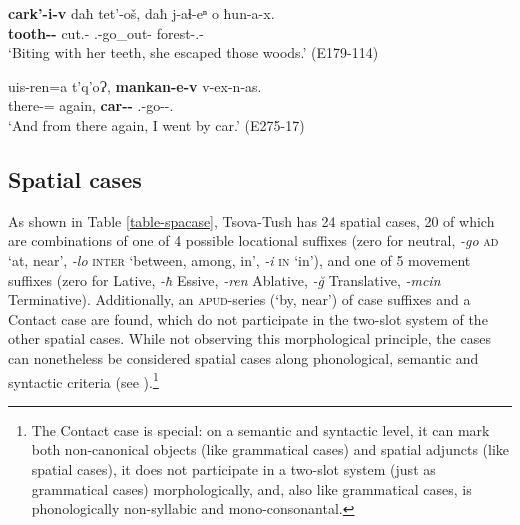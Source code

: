 \begin{exe}
	\ex\label{simplenp-ex27}
	\begin{xlist}
		
		\ex\label{simplenp-ex27a}
		\gll \textbf{cark'-i-v} daħ tet'-oš, daħ j-aɬ-eⁿ o ħun-a-x. \\
		\textbf{tooth-{\Pl}-{\Ins}} {\Pv} cut.{\Ipfv}-{\Simul} {\Pv} {\F}.{\Sg}-go\_out-{\Aor} {\Dist} forest-{\Obl}.{\Pl}-{\Cont} \\
		\trans `Biting with her teeth, she escaped those woods.'
		\hfill (E179-114)
		
		\ex\label{simplenp-ex27b}
		\gll uis-ren=a t'q'oɁ, \textbf{mankan-e-v} v-ex-n-as. \\
		there-{\Abl}={\Add} again, \textbf{car-{\Obl}-{\Ins}} {\M}.{\Sg}-go-{\Aor}-{\Fsg}.{\Erg} \\
		\trans `And from there again, I went by car.'
		\hfill (E275-17)
		
	\end{xlist}
\end{exe}



\subsection{Spatial cases} \label{spacase}

As shown in Table \ref{table-spacase}, Tsova-Tush has 24 spatial cases, 20 of which are combinations of one of 4 possible locational suffixes (zero for neutral, \textit{-go} \textsc{ad} `at, near', \textit{-lo} \textsc{inter} `between, among, in', \textit{-i} \textsc{in} `in'), and one of 5 movement suffixes (zero for Lative, \textit{-ħ} Essive, \textit{-ren} Ablative, \textit{-\u{g}} Translative, \textit{-mcin} Terminative).
Additionally, an \textsc{apud}-series (`by, near') of case suffixes and a Contact case are found, which do not participate in the two-slot system of the other spatial cases. While not observing this morphological principle, the cases can nonetheless be considered spatial cases along phonological, semantic and syntactic criteria (see ).\footnote{The Contact case is special: on a semantic and syntactic level, it can mark both non-canonical objects (like grammatical cases) and spatial adjuncts (like spatial cases), it does not participate in a two-slot system (just as grammatical cases) morphologically, and, also like grammatical cases, is phonologically non-syllabic and mono-consonantal.}



